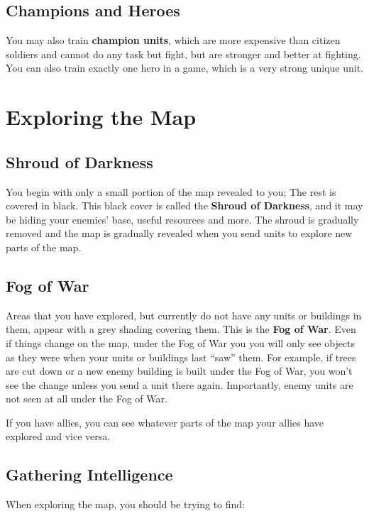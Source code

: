 \documentclass[a4paper,titlepage]{article}
\begin{document}
\subsection*{Champions and Heroes}

You may also train \textbf{champion units}, which are more expensive than citizen soldiers and cannot do any task but fight, but are stronger and better at fighting. You can also train exactly one hero in a game, which is a very strong unique unit.

\clearpage

\section{Exploring the Map}

\subsection*{Shroud of Darkness}

You begin with only a small portion of the map revealed to you; The rest is covered in black. This black cover is called the \textbf{Shroud of Darkness}, and it may be hiding your enemies’ base, useful resources and more. The shroud is gradually removed and the map is gradually revealed when you send units to explore new parts of the map.

\subsection*{Fog of War}

Areas that you have explored, but currently do not have any units or buildings in them, appear with a grey shading covering them. This is the \textbf{Fog of War}. Even if things change on the map, under the Fog of War you you will only see objects as they were when your units or buildings last “saw” them. For example, if trees are cut down or a new enemy building is built under the Fog of War, you won’t see the change unless you send a unit there again. Importantly, enemy units are not seen at all under the Fog of War.

If you have allies, you can see whatever parts of the map your allies have explored and vice versa.

\subsection*{Gathering Intelligence}

When exploring the map, you should be trying to find:
\end{document}
